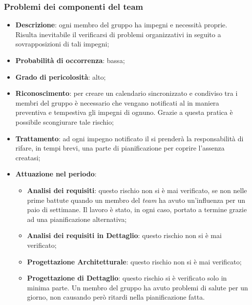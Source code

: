 		\subsubsection{Problemi dei componenti del team}
		\begin{itemize}
			\item \textbf{Descrizione}: ogni membro del gruppo ha impegni e necessità proprie. Risulta inevitabile il verificarsi di problemi organizzativi in seguito a sovrapposizioni di tali impegni;
			\item \textbf{Probabilità di occorrenza}: bassa;
			\item \textbf{Grado di pericolosità}: alto;
			\item \textbf{Riconoscimento}: per creare un calendario sincronizzato e condiviso tra i membri del gruppo è necessario che vengano notificati al \textit{\Res} in maniera preventiva e tempestiva gli impegni di ognuno. Grazie a questa pratica è possibile scongiurare tale rischio;
			\item \textbf{Trattamento}: ad ogni impegno notificato il \textit{\Res} si prenderà la responsabilità di rifare, in tempi brevi, una parte di pianificazione per coprire l'assenza creatasi;
			\item \textbf{Attuazione nel periodo}:
			\begin{itemize}
				\item \textbf{Analisi dei requisiti}: questo rischio non si è mai verificato, se non nelle prime battute quando un membro del \textit{team} ha avuto un'influenza per un paio di settimane. Il lavoro è stato, in ogni caso, portato a termine grazie ad una pianificazione alternativa;
				\item \textbf{Analisi dei requisiti in Dettaglio}: questo rischio non si è mai verificato;
				\item \textbf{Progettazione Architetturale}: questo rischio non si è mai verificato;
				\item \textbf{Progettazione di Dettaglio}: questo rischio si è verificato solo in minima parte. Un membro del gruppo ha avuto problemi di salute per un giorno, non causando però ritardi nella pianificazione fatta. 
			\end{itemize}
		\end{itemize}
		
